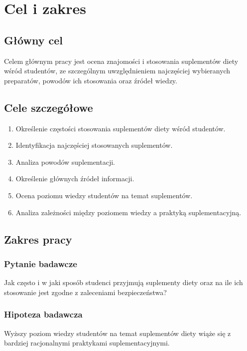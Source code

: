 \section{Cel i zakres}\label{Cel i zakres}

\subsection{Główny cel}

Celem głównym pracy jest ocena znajomości i stosowania suplementów diety wśród studentów, ze szczególnym uwzględnieniem najczęściej wybieranych preparatów, powodów ich stosowania oraz źródeł wiedzy.

\subsection{Cele szczegółowe}

\begin{enumerate}
    \item Określenie częstości stosowania suplementów diety wśród studentów.
    \item Identyfikacja najczęściej stosowanych suplementów.
    \item Analiza powodów suplementacji.
    \item Określenie głównych źródeł informacji.
    \item Ocena poziomu wiedzy studentów na temat suplementów.
    \item Analiza zależności między poziomem wiedzy a praktyką suplementacyjną.
\end{enumerate}

\subsection{Zakres pracy}

\subsubsection{Pytanie badawcze}
Jak często i w jaki sposób studenci przyjmują suplementy diety oraz na ile ich stosowanie jest zgodne z zaleceniami bezpieczeństwa?

\subsubsection{Hipoteza badawcza}
Wyższy poziom wiedzy studentów na temat suplementów diety wiąże się z bardziej racjonalnymi praktykami suplementacyjnymi.

